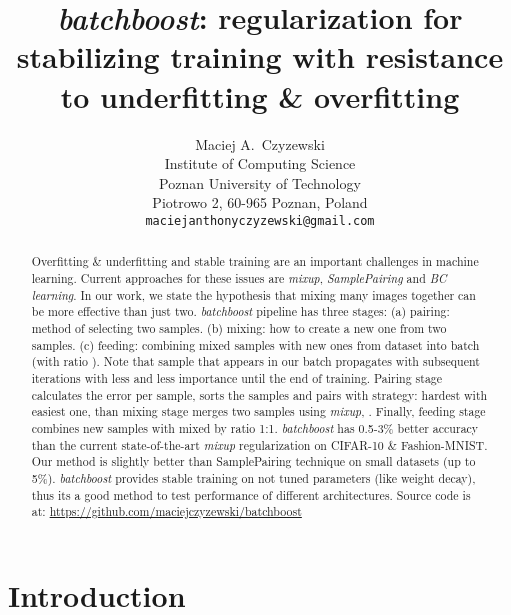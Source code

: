 \documentclass{article}
\title{\emph{batchboost}: regularization for stabilizing training with
	resistance to underfitting \& overfitting}
\author{
  Maciej A.~Czyzewski\\
  Institute of Computing Science\\
  Poznan University of Technology\\
  Piotrowo 2, 60-965 Poznan, Poland\\
  \texttt{maciejanthonyczyzewski@gmail.com} \\
}
\begin{document}
\maketitle



\begin{abstract}
	Overfitting \& underfitting and stable training are an important challenges in
	machine learning.
Current approaches for these issues are \emph{mixup}\cite{zhang2017mixup},
	\emph{SamplePairing}\cite{inoue2018data}
	and \emph{BC learning}\cite{tokozume2018between}.
	In our work, we state the hypothesis that mixing many images together can be more
	effective than just two.
	\emph{batchboost} pipeline has three stages:
	(a) pairing: method of selecting two samples.
	(b) mixing: how to create a new one from two samples.
	(c) feeding: combining mixed samples with new ones from dataset into batch (with ratio ).
	Note that sample that appears in our batch propagates with
	subsequent iterations with less and less importance until the end of training.
Pairing stage calculates the error per sample, sorts the samples and pairs
	with strategy: hardest with easiest one, than mixing stage merges two samples
	using \emph{mixup}, . Finally, feeding stage combines
	new samples with mixed by ratio 1:1. 
\emph{batchboost} has 0.5-3\% better accuracy than the current
	state-of-the-art \emph{mixup} regularization on
	CIFAR-10\cite{krizhevsky2009learning} \&
	Fashion-MNIST\cite{xiao2017}.
Our method is slightly better than SamplePairing technique
	on small datasets (up to 5\%).
\emph{batchboost} provides stable training on not tuned parameters (like weight
	decay), thus its a good method to test performance of different architectures.
Source code is at: \url{https://github.com/maciejczyzewski/batchboost}
\end{abstract}


\section{Introduction}
\label{sec:introduction}
\end{document}
